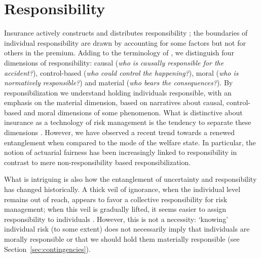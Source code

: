 \documentclass[11pt]{article} %
\begin{document}
\section{Responsibility}
Insurance actively constructs and distributes responsibility \citep{baker2002risk}; the boundaries of individual responsibility are drawn by accounting for some factors but not for others in the premium. 
Adding to the terminology of \citet{landes2015insurance}, we distinguish four dimensions of responsibility: causal (\textit{who is causally responsible for the accident?}), control-based (\textit{who could control the happening?}), moral (\textit{who is normatively responsible?}) and material (\textit{who bears the consequences?}). By responsibilization we understand holding individuals responsible, with an emphasis on the material dimension, based on narratives about causal, control-based and moral dimensions of some phenomenon. What is distinctive about insurance as a technology of risk management is the tendency to separate these dimensions \citep{landes2015insurance}. However, we have observed a recent trend towards a renewed entanglement when compared to the mode of the welfare state. In particular, the notion of actuarial fairness has been increasingly linked to responsibility in contrast to mere non-responsibility based responsibilization.


What is intriguing is also how the entanglement of uncertainty and responsibility has changed historically. A thick veil of ignorance, when the individual level remains out of reach, appears to favor a collective responsibility for risk management; when this veil is gradually lifted, it seems easier to assign responsibility to individuals \citep{frezal2020fairness,barry2020insurance}. However, this is not a necessity: `knowing' individual risk (to some extent) does not necessarily imply that individuals are morally responsible or that we should hold them materially responsible (see Section~\ref{sec:contingencies}).

\end{document}

